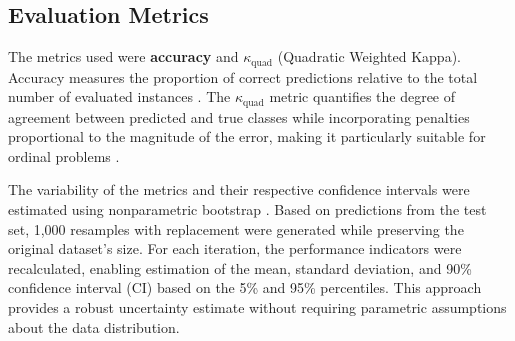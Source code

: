 \subsection{Evaluation Metrics}

The metrics used were \textbf{accuracy} and \textbf{$\kappa_{\text{quad}}$} (Quadratic Weighted Kappa). Accuracy measures the proportion of correct predictions relative to the total number of evaluated instances \cite{baldi2000assessing}. The $\kappa_{\text{quad}}$ metric quantifies the degree of agreement between predicted and true classes while incorporating penalties proportional to the magnitude of the error, making it particularly suitable for ordinal problems \cite{ref-cohen1968}.

The variability of the metrics and their respective confidence intervals were estimated using nonparametric bootstrap \cite{efron1979bootstrap}. Based on predictions from the test set, 1,000 resamples with replacement were generated while preserving the original dataset's size. For each iteration, the performance indicators were recalculated, enabling estimation of the mean, standard deviation, and 90\% confidence interval (CI) based on the 5\% and 95\% percentiles. This approach provides a robust uncertainty estimate without requiring parametric assumptions about the data distribution.